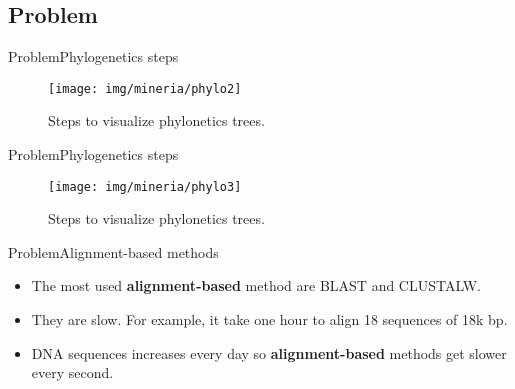\documentclass[10pt]{beamer}
\newcommand{\1}{
	\setbeamertemplate{background}{
		\texttt{[image: img/1\_dna]}
		\tikz[overlay] \fill[fill opacity=0.75,fill=white] (0,0) rectangle (-\paperwidth,\paperheight);
	}
}
\begin{document}
\subsection{Problem}

\begin{frame}{Problem}{Phylogenetics steps}
	\begin{figure}[]
		\centering
		\texttt{[image: img/mineria/phylo2]}
		\label{img:mot2}
		\caption{Steps to visualize phylonetics trees.}
	\end{figure}
\end{frame}

\begin{frame}{Problem}{Phylogenetics steps}
	\begin{figure}[]
		\centering
		\texttt{[image: img/mineria/phylo3]}
		\label{img:mot2}
		\caption{Steps to visualize phylonetics trees.}
	\end{figure}
\end{frame}


\begin{frame}{Problem}{Alignment-based methods}
	\begin{block}{}
		\begin{itemize}
			\item The most used \textbf{alignment-based} method are BLAST and CLUSTALW. \pause
			\item They are slow. For example, it take one hour to align 18 sequences of 18k bp. \pause
			\item DNA sequences increases every day so \textbf{alignment-based} methods get slower every second. \pause		 	
		\end{itemize}
	\end{block}
\end{frame}
\end{document}
